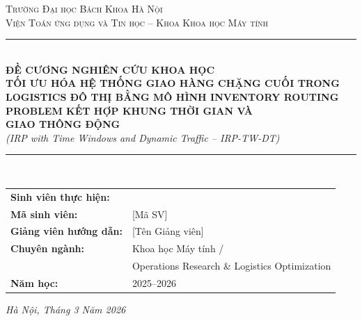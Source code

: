 \documentclass[12pt,a4paper]{article}
\begin{document}
\begin{titlepage}
\begin{center}
  \vspace*{1.0cm}

  {\small\scshape Trường Đại học Bách Khoa Hà Nội}\\[0.3cm]
  {\small\scshape Viện Toán ứng dụng và Tin học -- Khoa Khoa học Máy tính}\\[1.0cm]

  \rule{\linewidth}{1.5pt}\\[0.4cm]

  {\LARGE\bfseries\color{primary}
    ĐỀ CƯƠNG NGHIÊN CỨU KHOA HỌC}\\[0.6cm]

  {\large\bfseries\color{accent}
    TỐI ƯU HÓA HỆ THỐNG GIAO HÀNG CHẶNG CUỐI TRONG \\
    LOGISTICS ĐÔ THỊ BẰNG MÔ HÌNH INVENTORY ROUTING\\
    PROBLEM KẾT HỢP KHUNG THỜI GIAN VÀ\\
    GIAO THÔNG ĐỘNG}\\[0.4cm]

  {\normalsize\itshape\color{darkgray}
    (IRP with Time Windows and Dynamic Traffic -- IRP-TW-DT)}\\[0.2cm]

  \rule{\linewidth}{1.5pt}\\[1.5cm]

  \begin{flushleft}
    \begin{tabular}{@{}ll}
      \textbf{Sinh viên thực hiện:}  &  \\[4pt]
      \textbf{Mã sinh viên:}          & [Mã SV] \\[4pt]
      \textbf{Giảng viên hướng dẫn:} & [Tên Giảng viên] \\[4pt]
      \textbf{Chuyên ngành:}          & Khoa học Máy tính / \\
                                      & Operations Research \& Logistics Optimization \\[4pt]
      \textbf{Năm học:}               & 2025--2026 \\
    \end{tabular}
  \end{flushleft}

  \vfill
  {\normalsize\itshape Hà Nội, Tháng 3 Năm 2026}
\end{center}
\end{titlepage}
\end{document}
